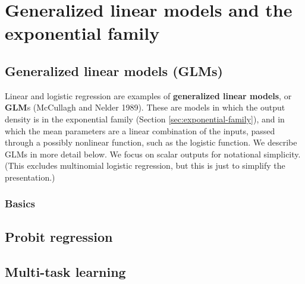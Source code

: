 \chapter{Generalized linear models and the exponential family}
\label{chap:GLM}



\section{Generalized linear models (GLMs)}
\label{sec:GLMs}
Linear and logistic regression are examples of \textbf{generalized linear models}, or \textbf{GLM}s (McCullagh and Nelder 1989). These are models in which the output density is in the exponential family (Section \ref{sec:exponential-family}), and in which the mean parameters are a linear combination of the inputs, passed through a possibly nonlinear function, such as the logistic function. We describe GLMs in more detail below. We focus on scalar outputs for notational simplicity. (This excludes multinomial logistic regression, but this is just to simplify the presentation.)


\subsection{Basics}



\section{Probit regression}



\section{Multi-task learning}



